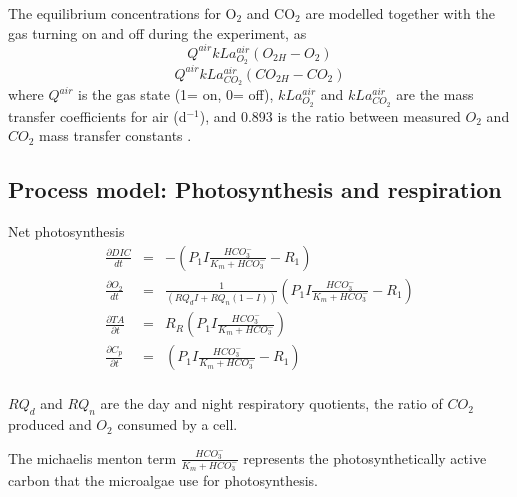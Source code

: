 \documentclass{ruthesis}
\begin{document}
The equilibrium concentrations for O$_2$ and CO$_2$ are modelled together with the gas turning on and off during the experiment, as
\begin{equation}
 Q^{air} kLa_{O_2}^{air} (O_{2H} - O_{2})
\end{equation}
\begin{equation}
 Q^{air} kLa_{CO_2}^{air} (CO_{2H} - CO_{2})
\end{equation}
where $Q^{air}$ is the gas state (1= on, 0= off), $kLa_{O_2}^{air}$ and $kLa_{CO_2}^{air}$ are the mass transfer coefficients for air (d$^{-1}$), and 0.893 is the ratio between measured $O_2$ and $CO_2$ mass transfer constants \cite{grima1993gas}.



\subsection{Process model: Photosynthesis and respiration}

Net photosynthesis
\begin{align}
\frac{\partial DIC}{dt} &=&  -(P_1 I \frac{HCO_3^-}{K_m + HCO_3^-}  - R_1) 
\\
\frac{\partial O_2}{dt}	&=&  \frac{1}{(RQ_d I + RQ_n(1-I))}(P_1 I \frac{HCO_3^-}{K_m + HCO_3^-}  - R_1)
\\
\frac{\partial TA}{\partial t}  &=&      R_R (P_1 I \frac{HCO_3^-}{K_m + HCO_3^-})
\\
\frac{\partial C_p}{\partial t} &=& (P_1 I \frac{HCO_3^-}{K_m + HCO_3^-} - R_1) 
\\\nonumber
\end{align} 



$RQ_d$ and $RQ_n$ are the day and night respiratory quotients, the ratio of $CO_2$ produced and $O_2$ consumed by a cell. 




The michaelis menton term $ \frac{HCO_3^-}{K_m + HCO_3^-} $ represents the photosynthetically active carbon that the microalgae use for photosynthesis. 
\end{document}
